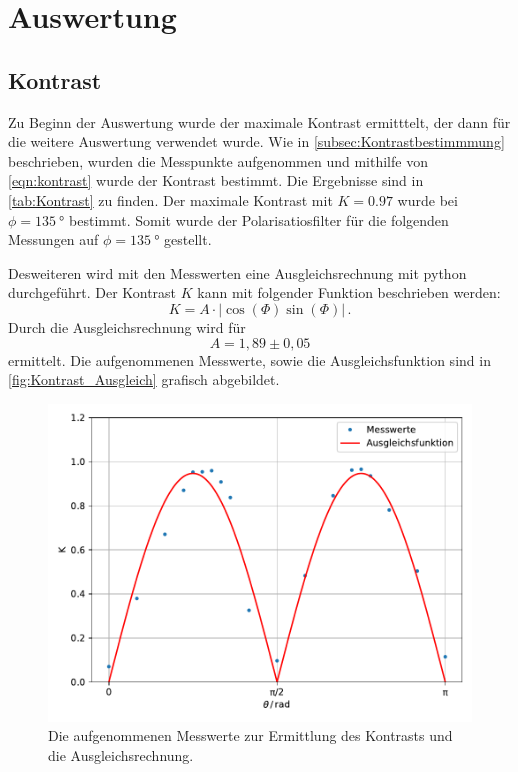 \section{Auswertung}
\label{sec:Auswertung}

\subsection{Kontrast}
\label{subsec:Kontrast}
Zu Beginn der Auswertung wurde der maximale Kontrast ermitttelt, der dann für die weitere Auswertung verwendet wurde.
Wie in \autoref{subsec:Kontrastbestimmmung} beschrieben, wurden die Messpunkte aufgenommen und mithilfe von \autoref{eqn:kontrast} wurde der Kontrast bestimmt.
Die Ergebnisse sind in \autoref{tab:Kontrast} zu finden.
Der maximale Kontrast mit $K = \num{0.97}$ wurde bei $\phi = \SI{135}{\degree}$ bestimmt.
Somit wurde der Polarisatiosfilter für die folgenden Messungen auf $\phi = \SI{135}{\degree}$ gestellt.

\noindent
Desweiteren wird mit den Messwerten eine Ausgleichsrechnung mit python durchgeführt.
Der Kontrast $K$ kann mit folgender Funktion beschrieben werden:
\begin{equation*}
  K = A \cdot | \cos(\Phi)\sin(\Phi) | \, .
\end{equation*}
Durch die Ausgleichsrechnung wird für 
\begin{equation*}
  A = 1,89 \pm 0,05
\end{equation*} 
ermittelt.
Die aufgenommenen Messwerte, sowie die Ausgleichsfunktion sind in \autoref{fig:Kontrast_Ausgleich} grafisch abgebildet.

\begin{figure}[H]
  \centering
  \includegraphics[width=\textwidth]{build/kontrast_ausgleich.pdf}
  \caption{Die aufgenommenen Messwerte zur Ermittlung des Kontrasts und die Ausgleichsrechnung.}
  \label{fig:Kontrast_Ausgleich}
\end{figure}

